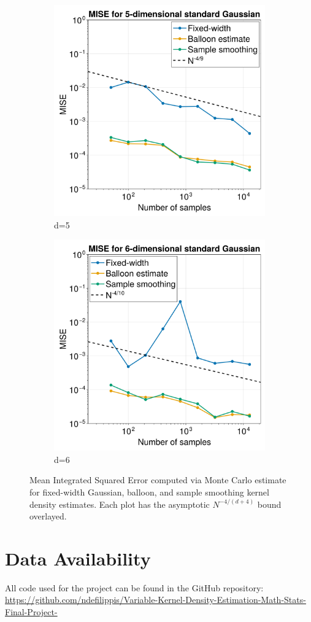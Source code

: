 \documentclass{article}
\begin{document}
\begin{figure}
\begin{subfigure}{.5\textwidth}
  \includegraphics[width=0.7\linewidth]{images/MISE_d=5.png}
  \caption{d=5}
  \label{fig:MISE-5}
\end{subfigure}
\begin{subfigure}{.5\textwidth}
  \centering
  \includegraphics[width=0.7\linewidth]{images/MISE_d=6.png}
  \caption{d=6}
  \label{fig:MISE-6}
\end{subfigure}
\caption{Mean Integrated Squared Error computed via Monte Carlo estimate for fixed-width Gaussian, balloon, and sample smoothing kernel density estimates. Each plot has the asymptotic $N^{-4/(d+4)}$ bound overlayed.}
\label{fig:MISE}
\end{figure}

\section{Data Availability}

All code used for the project can be found in the GitHub repository: \url{https://github.com/ndefilippis/Variable-Kernel-Density-Estimation-Math-Stats-Final-Project-}

\printbibliography
\end{document}
